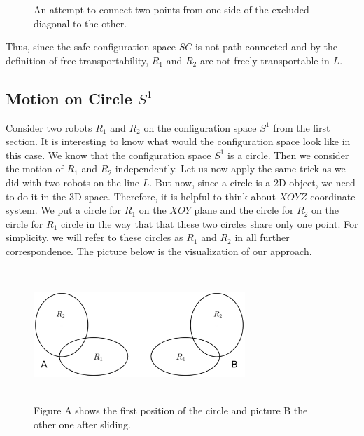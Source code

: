 \documentclass[12pt]{article}
\theoremstyle{definition}
\begin{document}
\begin{figure}[H]
    \centering
    \caption*{An attempt to connect two points from one side of the excluded diagonal to the other.}
\end{figure}

Thus, since the safe configuration space $SC$ is not path connected and by the definition of
free transportability, $R_1$ and $R_2$ are not freely transportable in $L$.

\subsection*{\centering Motion on Circle $S^1$}

Consider two robots $R_1$ and $R_2$ on the configuration space $S^1$ from the first section.
It is interesting to know what would the configuration space look like in this case.
We know that the configuration space $S^1$ is a circle. Then we consider the motion of $R_1$ and $R_2$ independently.
Let us now apply the same trick as we did with two robots on the line $L$. But now, since a circle is a 2D object,
we need to do it in the 3D space. Therefore, it is helpful to think about $XOYZ$ coordinate system.
We put a circle for $R_1$ on the $XOY$ plane and the circle for $R_2$ on the circle for $R_1$ circle in the way that
that these two circles share only one point. For simplicity, we will refer to these circles as $R_1$ and $R_2$
in all further correspondence. The picture below is the visualization of our approach.

\begin{figure}[H]
    \centering
    \includegraphics[width=8cm, height=5cm]{two-circles}
    \caption*{Figure A shows the first position of the circle and picture B the other one after sliding.}
\end{figure}
\end{document}
